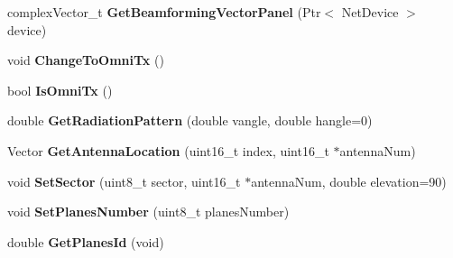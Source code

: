 \begin{DoxyCompactItemize}
complex\+Vector\+\_\+t {\bfseries Get\+Beamforming\+Vector\+Panel} (Ptr$<$ Net\+Device $>$ device)
\item 
\mbox{\label{classns3_1_1millicar_1_1MmWaveVehicularAntennaArrayModel_a521d963c3c113ad294783042630a727a}} 
void {\bfseries Change\+To\+Omni\+Tx} ()
\item 
\mbox{\label{classns3_1_1millicar_1_1MmWaveVehicularAntennaArrayModel_af8dd71912feca69c61de21b73a48864c}} 
bool {\bfseries Is\+Omni\+Tx} ()
\item 
\mbox{\label{classns3_1_1millicar_1_1MmWaveVehicularAntennaArrayModel_a5d18fb70c35545e3fb6ceab7cdfbf29f}} 
double {\bfseries Get\+Radiation\+Pattern} (double vangle, double hangle=0)
\item 
\mbox{\label{classns3_1_1millicar_1_1MmWaveVehicularAntennaArrayModel_ac56f86f72c7f92e13cc846f803c53f0c}} 
Vector {\bfseries Get\+Antenna\+Location} (uint16\+\_\+t index, uint16\+\_\+t $\ast$antenna\+Num)
\item 
\mbox{\label{classns3_1_1millicar_1_1MmWaveVehicularAntennaArrayModel_a18cb8824e341b7d80d1fd9a011604a8d}} 
void {\bfseries Set\+Sector} (uint8\+\_\+t sector, uint16\+\_\+t $\ast$antenna\+Num, double elevation=90)
\item 
\mbox{\label{classns3_1_1millicar_1_1MmWaveVehicularAntennaArrayModel_aad67935b04563306cbb4e28fcd075758}} 
void {\bfseries Set\+Planes\+Number} (uint8\+\_\+t planes\+Number)
\item 
\mbox{\label{classns3_1_1millicar_1_1MmWaveVehicularAntennaArrayModel_ad45087d492c9127b7d2113c6866b40b6}} 
double {\bfseries Get\+Planes\+Id} (void)
\item 
\mbox{\label{classns3_1_1millicar_1_1MmWaveVehicularAntennaArrayModel_adb3a2e826cde719d7cc32b23bafeee98}} 

\end{DoxyCompactItemize}

